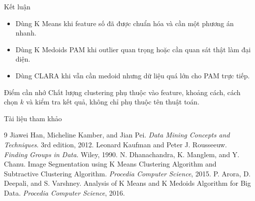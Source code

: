 \documentclass[aspectratio=169,11pt]{beamer}
\begin{document}
\begin{frame}{Kết luận}
\begin{itemize}
  \item Dùng K Means khi feature số đã được chuẩn hóa và cần một phương án nhanh.
  \item Dùng K Medoids PAM khi outlier quan trọng hoặc cần quan sát thật làm đại diện.
  \item Dùng CLARA khi vẫn cần medoid nhưng dữ liệu quá lớn cho PAM trực tiếp.
\end{itemize}
\vspace{0.6em}
\begin{block}{Điểm cần nhớ}
Chất lượng clustering phụ thuộc vào feature, khoảng cách, cách chọn $k$ và kiểm tra kết quả, không chỉ phụ thuộc tên thuật toán.
\end{block}
\end{frame}

\begin{frame}{Tài liệu tham khảo}
\small
\begin{thebibliography}{9}
 Jiawei Han, Micheline Kamber, and Jian Pei. \textit{Data Mining Concepts and Techniques}. 3rd edition, 2012.
 Leonard Kaufman and Peter J. Rousseeuw. \textit{Finding Groups in Data}. Wiley, 1990.
 N. Dhanachandra, K. Manglem, and Y. Chanu. Image Segmentation using K Means Clustering Algorithm and Subtractive Clustering Algorithm. \textit{Procedia Computer Science}, 2015.
 P. Arora, D. Deepali, and S. Varshney. Analysis of K Means and K Medoids Algorithm for Big Data. \textit{Procedia Computer Science}, 2016.
\end{thebibliography}
\end{frame}
\end{document}
